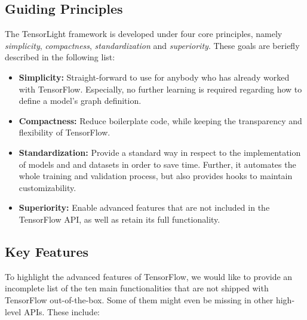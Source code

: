 \subsection{Guiding Principles}

The TensorLight framework is developed under four core principles, namely \textit{simplicity}, \textit{compactness}, \textit{standardization} and \textit{superiority}. These goals are beriefly described in the following list:

\begin{itemize}
\item \textbf{Simplicity:} Straight-forward to use for anybody who has already worked with TensorFlow. Especially, no further learning is required regarding how to define a model's graph definition.
\item \textbf{Compactness:} Reduce boilerplate code, while keeping the transparency and flexibility of TensorFlow. 
\item \textbf{Standardization:} Provide a standard way in respect to the implementation of models and and datasets in order to save time. Further, it automates the whole training and validation process, but also provides hooks to maintain customizability.
\item \textbf{Superiority:} Enable advanced features that are not included in the TensorFlow API, as well as retain its full functionality.
\end{itemize}


\subsection{Key Features}

To highlight the advanced features of TensorFlow, we would like to provide an incomplete list of the ten main functionalities that are not shipped with TensorFlow out-of-the-box. Some of them might even be missing in other high-level APIs. These include:

